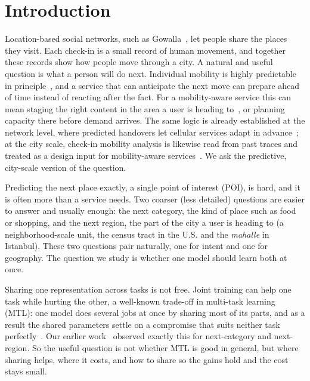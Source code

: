 \section{Introduction}
\label{sec:intro}

Location-based social networks, such as Gowalla~\cite{cho2011gowalla},
let people share the places they visit. Each check-in is a small record of human
movement, and together these records show how people move through a city. A
natural and useful question is what a person will do next. Individual mobility
is highly predictable in principle~\cite{song2010limits}, and a service that
can anticipate the next move can prepare ahead of time instead of reacting
after the fact. For a mobility-aware service this can mean staging the right
content in the area a user is heading to~\cite{bastug2014edge}, or planning
capacity there before demand arrives. The same logic is
already established at the network level, where predicted handovers let
cellular services adapt in advance~\cite{vielhaus2022handover}; at the city
scale, check-in mobility analysis is likewise read from past traces and
treated as a design input for
mobility-aware services~\cite{moura2025mobilityaware}. We ask the predictive,
city-scale version of the question.

Predicting the next place exactly, a single point of interest (POI), is hard, and
it is often more than a service needs. Two coarser (less detailed) questions are
easier to answer and usually enough: the next category, the kind of place such as
food or shopping, and the next region, the part of the city a user is heading to
(a neighborhood-scale unit, the census tract in the U.S. and the \emph{mahalle}
in Istanbul). These two questions pair naturally, one for intent and one for
geography. The question we study is whether one model should learn both
at once.

Sharing one representation across tasks is not free. Joint training can help one
task while hurting the other, a well-known trade-off in multi-task learning
(MTL): one model does several jobs at once by sharing most of its parts, and as a
result the shared parameters settle on a compromise that suits neither task
perfectly~\cite{caruana1997multitask}. Our earlier work~\cite{silva2025mtlnet}
observed exactly this for next-category and next-region. So the useful question is
not whether MTL is good in general, but where sharing helps, where it costs, and
how to share so the gains hold and the cost stays small.

